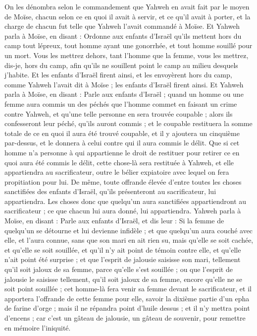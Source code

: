 \begin{multicols}{2}
On les dénombra selon le commandement que Yahweh en avait fait par le moyen de Moïse, chacun selon ce en quoi il avait à servir, et ce qu'il avait à porter, et la charge de chacun fut telle que Yahweh l'avait commandé à Moïse.
\VerseOne{}Et Yahweh parla à Moïse, en disant :
Ordonne aux enfants d'Israël qu'ils mettent hors du camp tout lépreux, tout homme ayant une gonorrhée, et tout homme souillé pour un mort.
Vous les mettrez dehors, tant l'homme que la femme, vous les mettrez, dis-je, hors du camp, afin qu'ils ne souillent point le camp au milieu desquels j'habite.
Et les enfants d'Israël firent ainsi, et les envoyèrent hors du camp, comme Yahweh l'avait dit à Moïse ; les enfants d'Israël firent ainsi.
Et Yahweh parla à Moïse, en disant :
Parle aux enfants d'Israël ; quand un homme ou une femme aura commis un des péchés que l'homme commet en faisant un crime contre Yahweh, et qu'une telle personne en sera trouvée coupable ;
alors ils confesseront leur péché, qu'ils auront commis ; et le coupable restituera la somme totale de ce en quoi il aura été trouvé coupable, et il y ajoutera un cinquième par-dessus, et le donnera à celui contre qui il aura commis le délit.
Que si cet homme n'a personne à qui appartienne le droit de restituer pour retirer ce en quoi aura été commis le délit, cette chose-là sera restituée à Yahweh, et elle appartiendra au sacrificateur, outre le bélier expiatoire avec lequel on fera propitiation pour lui.
De même, toute offrande élevée d'entre toutes les choses sanctifiées des enfants d'Israël, qu'ils présenteront au sacrificateur, lui appartiendra.
 Les choses donc que quelqu'un aura sanctifiées appartiendront au sacrificateur ; ce que chacun lui aura donné, lui appartiendra.
Yahweh parla à Moïse, en disant :
Parle aux enfants d'Israël, et dis leur : Si la femme de quelqu'un se détourne et lui devienne infidèle ;
et que quelqu'un aura couché avec elle, et l'aura connue, sans que son mari en ait rien su, mais qu'elle se soit cachée, et qu'elle se soit souillée, et qu'il n'y ait point de témoin contre elle, et qu'elle n'ait point été surprise ;
et que l'esprit de jalousie saisisse son mari, tellement qu'il soit jaloux de sa femme, parce qu'elle s'est souillée ; ou que l'esprit de jalousie le saisisse tellement, qu'il soit jaloux de sa femme, encore qu'elle ne se soit point souillée ;
cet homme-là fera venir sa femme devant le sacrificateur, et il apportera l'offrande de cette femme pour elle, savoir la dixième partie d'un epha de farine d'orge ; mais il ne répandra point d'huile dessus ; et il n'y mettra point d'encens ; car c'est un gâteau de jalousie, un gâteau de souvenir, pour remettre en mémoire l'iniquité.

\end{multicols}
